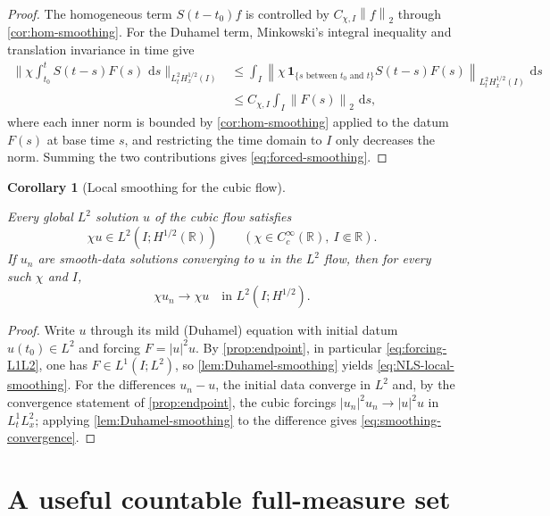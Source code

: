 \documentclass[11pt,oneside]{book}
\providecommand{\uses}[1]{}
\newtheorem{corollary}[theorem]{Corollary}
\theoremstyle{definition}
\theoremstyle{remark}
\newcommand{\R}{\mathbb R}
\newcommand{\1}{\mathbf 1}
\newcommand{\dd}{\,\mathrm d}
\newcommand{\norm}[1]{\left\lVert #1\right\rVert}
\begin{document}
\begin{proof}
\uses{cor:hom-smoothing}
The homogeneous term $S(t-t_0)f$ is controlled by $C_{\chi,I}\norm f_2$ through
\cref{cor:hom-smoothing}. For the Duhamel term, Minkowski's integral inequality
and translation invariance in time give
\begin{align*}
 \Big\|\chi\!\int_{t_0}^tS(t-s)F(s)\,\dd s\Big\|_{L^2_tH^{1/2}_x(I)}
 &\le\int_I
 \norm{\chi\,\1_{\{s\text{ between }t_0\text{ and }t\}}
       S(t-s)F(s)}_{L^2_tH^{1/2}_x(I)}\,\dd s\\
 &\le C_{\chi,I}\int_I\norm{F(s)}_2\,\dd s ,
\end{align*}
where each inner norm is bounded by \cref{cor:hom-smoothing} applied to the
datum $F(s)$ at base time $s$, and restricting the time domain to $I$ only
decreases the norm. Summing the two contributions gives
\eqref{eq:forced-smoothing}.
\end{proof}

\begin{corollary}[Local smoothing for the cubic flow]\label{cor:NLS-smoothing}
\uses{lem:Duhamel-smoothing, prop:endpoint}
Every global $L^2$ solution $u$ of the cubic flow satisfies
\begin{equation}
  \chi u\in L^2(I;H^{1/2}(\R))
  \qquad(\chi\in C_c^\infty(\R),\ I\Subset\R).
  \label{eq:NLS-local-smoothing}
\end{equation}
If $u_n$ are smooth-data solutions converging to $u$ in the $L^2$ flow, then for
every such $\chi$ and $I$,
\begin{equation}
  \chi u_n\to\chi u
  \quad\text{in }L^2(I;H^{1/2}).
  \label{eq:smoothing-convergence}
\end{equation}
\end{corollary}

\begin{proof}
\uses{lem:Duhamel-smoothing, prop:endpoint}
Write $u$ through its mild (Duhamel) equation with initial datum $u(t_0)\in L^2$
and forcing $F=|u|^2u$. By \cref{prop:endpoint}, in particular
\eqref{eq:forcing-L1L2}, one has $F\in L^1(I;L^2)$, so
\cref{lem:Duhamel-smoothing} yields \eqref{eq:NLS-local-smoothing}. For the
differences $u_n-u$, the initial data converge in $L^2$ and, by the convergence
statement of \cref{prop:endpoint}, the cubic forcings $|u_n|^2u_n\to|u|^2u$ in
$L^1_tL^2_x$; applying \cref{lem:Duhamel-smoothing} to the difference gives
\eqref{eq:smoothing-convergence}.
\end{proof}

\section{A useful countable full-measure set}
\end{document}
